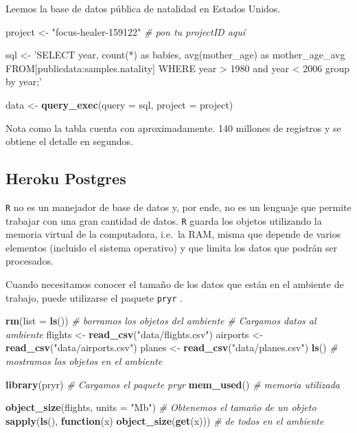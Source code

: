 \documentclass[]{article}
\newenvironment{Shaded}{\begin{snugshade}}{\end{snugshade}}
\newcommand{\KeywordTok}[1]{\textcolor[rgb]{0.13,0.29,0.53}{\textbf{#1}}}
\newcommand{\DataTypeTok}[1]{\textcolor[rgb]{0.13,0.29,0.53}{#1}}
\newcommand{\StringTok}[1]{\textcolor[rgb]{0.31,0.60,0.02}{#1}}
\newcommand{\CommentTok}[1]{\textcolor[rgb]{0.56,0.35,0.01}{\textit{#1}}}
\newcommand{\ControlFlowTok}[1]{\textcolor[rgb]{0.13,0.29,0.53}{\textbf{#1}}}
\newcommand{\NormalTok}[1]{#1}
\begin{document}
Leemos la base de datos pública de natalidad en Estados Unidos.

\begin{Shaded}
\begin{Highlighting}[]
\NormalTok{project <-}\StringTok{ "focus-healer-159122"} \CommentTok{# pon tu projectID aquí}
 
\NormalTok{sql <-}\StringTok{ 'SELECT year, count(*) as babies, avg(mother_age) as mother_age_avg}
\StringTok{FROM[publicdata:samples.natality] }
\StringTok{WHERE year > 1980 and year < 2006}
\StringTok{group by year;'}
 
\NormalTok{data <-}\StringTok{ }\KeywordTok{query_exec}\NormalTok{(}\DataTypeTok{query =}\NormalTok{ sql, }\DataTypeTok{project =}\NormalTok{ project)}
\end{Highlighting}
\end{Shaded}

Nota como la tabla cuenta con aproximadamente. 140 millones de registros
y se obtiene el detalle en segundos.

\subsection{Heroku Postgres}\label{heroku-postgres}

\texttt{R} no es un manejador de base de datos y, por ende, no es un
lenguaje que permite trabajar con una gran cantidad de datos. \texttt{R}
guarda los objetos utilizando la memoria virtual de la computadora,
i.e.~la RAM, misma que depende de varios elementos (incluido el sistema
operativo) y que limita los datos que podrán ser procesados.

Cuando necesitamos conocer el tamaño de los datos que están en el
ambiente de trabajo, puede utilizarse el paquete \texttt{pryr}
\parencite[][sección ``the role of physical memory'']{pryr}.

\begin{Shaded}
\begin{Highlighting}[]
\KeywordTok{rm}\NormalTok{(}\DataTypeTok{list =} \KeywordTok{ls}\NormalTok{()) }\CommentTok{# borramos los objetos del ambiente}
\CommentTok{# Cargamos datos al ambiente}
\NormalTok{flights <-}\StringTok{ }\KeywordTok{read_csv}\NormalTok{(}\StringTok{"data/flights.csv"}\NormalTok{)}
\NormalTok{airports <-}\StringTok{ }\KeywordTok{read_csv}\NormalTok{(}\StringTok{"data/airports.csv"}\NormalTok{)}
\NormalTok{planes <-}\StringTok{ }\KeywordTok{read_csv}\NormalTok{(}\StringTok{"data/planes.csv"}\NormalTok{)}
\KeywordTok{ls}\NormalTok{() }\CommentTok{# mostramos los objetos en el ambiente}

\KeywordTok{library}\NormalTok{(pryr) }\CommentTok{# Cargamos el paquete pryr}
\KeywordTok{mem_used}\NormalTok{() }\CommentTok{# memoria utilizada}

\KeywordTok{object_size}\NormalTok{(flights, }\DataTypeTok{units =} \StringTok{"Mb"}\NormalTok{) }\CommentTok{# Obtenemos el tamaño de un objeto}
\KeywordTok{sapply}\NormalTok{(}\KeywordTok{ls}\NormalTok{(), }\ControlFlowTok{function}\NormalTok{(x) }\KeywordTok{object_size}\NormalTok{(}\KeywordTok{get}\NormalTok{(x))) }\CommentTok{# de todos en el ambiente}
\end{Highlighting}
\end{Shaded}
\end{document}
